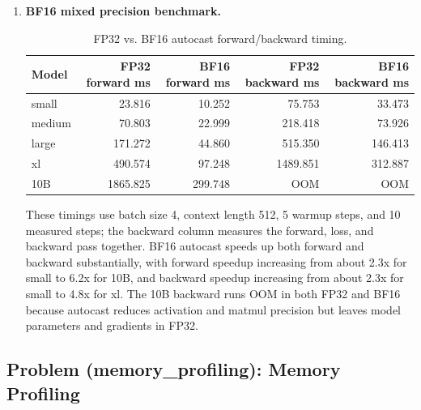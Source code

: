 \documentclass[11pt]{article}
\begin{document}
\begin{enumerate}
  \item \textbf{BF16 mixed precision benchmark.}
  \begin{table}[H]
    \centering
    \caption{FP32 vs. BF16 autocast forward/backward timing.}
    \begin{tabular}{lrrrr}
      \toprule
      Model & FP32 forward ms & BF16 forward ms & FP32 backward ms & BF16 backward ms \\
      \midrule
      small & 23.816 & 10.252 & 75.753 & 33.473 \\
      medium & 70.803 & 22.999 & 218.418 & 73.926 \\
      large & 171.272 & 44.860 & 515.350 & 146.413 \\
      xl & 490.574 & 97.248 & 1489.851 & 312.887 \\
      10B & 1865.825 & 299.748 & \textsc{OOM} & \textsc{OOM} \\
      \bottomrule
    \end{tabular}
  \end{table}
  These timings use batch size 4, context length 512, 5 warmup steps, and 10 measured steps; the backward column measures the forward, loss, and backward pass together. BF16 autocast speeds up both forward and backward substantially, with forward speedup increasing from about 2.3x for small to 6.2x for 10B, and backward speedup increasing from about 2.3x for small to 4.8x for xl. The 10B backward runs OOM in both FP32 and BF16 because autocast reduces activation and matmul precision but leaves model parameters and gradients in FP32.
\end{enumerate}

\subsection{Problem (memory\_profiling): Memory Profiling}
\end{document}
